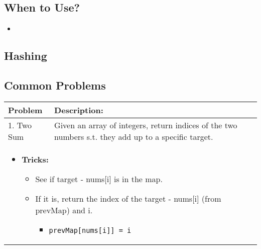 \subsection{When to Use?}
\begin{summary}
    \begin{itemize}
        \item 
    \end{itemize}
\end{summary}

\subsection{Hashing}
\begin{algo}
    
\end{algo}

\subsection{Common Problems}
\begin{summary}
    \begin{center}
        \begin{tabular}{ll}
            \toprule
            \textbf{Problem} & \textbf{Description:} \\
            \midrule
            1. Two Sum & Given an array of integers, return indices of the two numbers s.t. they add up to a specific target. \\            
            \multicolumn{2}{p{\linewidth}}{
                \begin{itemize}
                    \item \textbf{Tricks:}
                    \begin{itemize}
                        \item See if target - nums[i] is in the map.
                        \item If it is, return the index of the target - nums[i] (from prevMap) and i. 
                        \begin{itemize}
                            \item \texttt{prevMap[nums[i]] = i}
                        \end{itemize}
                    \end{itemize}
                \end{itemize}
            } \\
            \bottomrule
        \end{tabular}
    \end{center}
\end{summary}